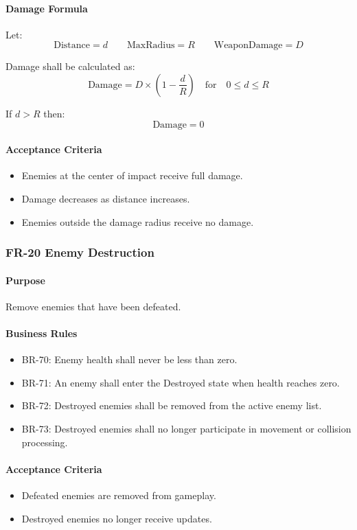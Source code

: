 \documentclass[11pt,a4paper]{article}
\begin{document}
\paragraph{Damage Formula}
Let:
\[ \text{Distance} = d \qquad \text{MaxRadius} = R \qquad \text{WeaponDamage} = D \]

Damage shall be calculated as:
\[ \text{Damage} = D \times \left(1 - \frac{d}{R}\right) \quad \text{for} \quad 0 \le d \le R \]

If $d > R$ then:
\[ \text{Damage} = 0 \]

\paragraph{Acceptance Criteria}
\begin{itemize}
  \item Enemies at the center of impact receive full damage.
  \item Damage decreases as distance increases.
  \item Enemies outside the damage radius receive no damage.
\end{itemize}

\subsubsection{FR-20 Enemy Destruction}

\paragraph{Purpose}
Remove enemies that have been defeated.

\paragraph{Business Rules}
\begin{itemize}
  \item BR-70: Enemy health shall never be less than zero.
  \item BR-71: An enemy shall enter the Destroyed state when health reaches zero.
  \item BR-72: Destroyed enemies shall be removed from the active enemy list.
  \item BR-73: Destroyed enemies shall no longer participate in movement or
        collision processing.
\end{itemize}

\paragraph{Acceptance Criteria}
\begin{itemize}
  \item Defeated enemies are removed from gameplay.
  \item Destroyed enemies no longer receive updates.
\end{itemize}
\end{document}
